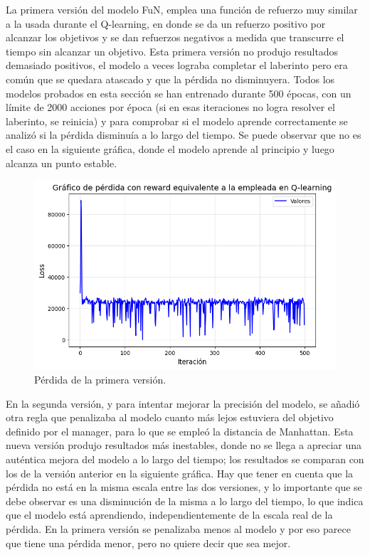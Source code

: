 \documentclass[letterpaper]{article} %
\begin{document}
La primera versión del modelo FuN, emplea una función de refuerzo muy similar a la usada durante el Q-learning, en donde se da un refuerzo positivo por alcanzar los objetivos y se dan refuerzos negativos a medida que transcurre el tiempo sin alcanzar un objetivo. 
Esta primera versión no produjo resultados demasiado positivos, el modelo a veces lograba completar el laberinto pero era común que se quedara atascado y que la pérdida no disminuyera. 
Todos los modelos probados en esta sección se han entrenado durante 500 épocas, con un límite de 2000 acciones por época (si en esas iteraciones no logra resolver el laberinto, 
se reinicia) y para comprobar si el modelo aprende correctamente se analizó si la pérdida disminuía a lo largo del tiempo. Se puede observar que no es el caso en la siguiente gráfica, donde el modelo aprende al principio y luego alcanza un punto estable.

\begin{figure}[H]
    \centering
    \includegraphics[width=0.9\columnwidth]{FuN_1.png}
    \caption{Pérdida de la primera versión.}
    \label{fig:FuN1}
\end{figure}

En la segunda versión, y para intentar mejorar la precisión del modelo, se añadió otra regla que penalizaba al modelo cuanto más lejos estuviera del objetivo definido por el manager, para lo que se empleó la distancia de Manhattan. Esta nueva versión 
produjo resultados más inestables, donde no se llega a apreciar una auténtica mejora del modelo a lo largo del tiempo; los resultados se comparan con los de la versión anterior en la siguiente gráfica. Hay que tener en cuenta que la pérdida no está
en la misma escala entre las dos versiones, y lo importante que se debe observar es una disminución de la misma a lo largo del tiempo, lo que indica que el modelo está aprendiendo, independientemente de la escala real de la pérdida. En la primera versión se 
penalizaba menos al modelo y por eso parece que tiene una pérdida menor, pero no quiere decir que sea mejor.
\end{document}
